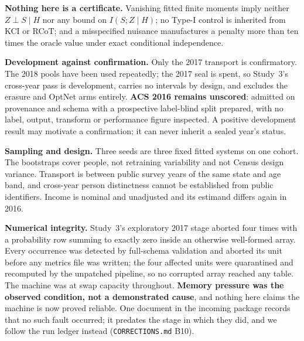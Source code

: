 \documentclass[10pt]{article}
\begin{document}
\textbf{Nothing here is a certificate.} Vanishing fitted finite moments imply neither $Z\perp S\mid H$
nor any bound on $I(S;Z\mid H)$; no Type-I control is inherited from KCI or RCoT; and a misspecified
nuisance manufactures a penalty more than ten times the oracle value under exact conditional
independence.

\textbf{Development against confirmation.} Only the 2017 transport is confirmatory. The 2018 pools
have been used repeatedly; the 2017 seal is spent, so Study~3's cross-year pass is development,
carries no intervals by design, and excludes the erasure and OptNet arms entirely. \textbf{ACS 2016
remains unscored}: admitted on provenance and schema with a prospective label-blind split prepared,
with no label, output, transform or performance figure inspected. A positive development result may
motivate a confirmation; it can never inherit a sealed year's status.

\textbf{Sampling and design.} Three seeds are three fixed fitted systems on one cohort. The bootstraps
cover people, not retraining variability and not Census design variance. Transport is between public
survey years of the same state and age band, and cross-year person distinctness cannot be established
from public identifiers. Income is nominal and unadjusted and its estimand differs again in 2016.

\textbf{Numerical integrity.} Study~3's exploratory 2017 stage aborted four times with a probability
row summing to exactly zero inside an otherwise well-formed array. Every occurrence was detected by
full-schema validation and aborted its unit before any metrics file was written; the four affected
units were quarantined and recomputed by the unpatched pipeline, so no corrupted array reached any
table. The machine was at swap capacity throughout. \textbf{Memory pressure was the observed
condition, not a demonstrated cause}, and nothing here claims the machine is now proved reliable. One
document in the incoming package records that no such fault occurred; it predates the stage in which
they did, and we follow the run ledger instead (\texttt{CORRECTIONS.md} B10).

\begin{table}[t]
\centering\scriptsize

\caption{Every load-bearing claim, its status, the measurement behind it, and what it does not
establish. The full traceable list, with source commit, artifact, endpoint, data pool and uncertainty
procedure for each, is \texttt{CLAIM\_LEDGER.csv}.}
\label{tab:claimsupport}
\end{table}
\end{document}
